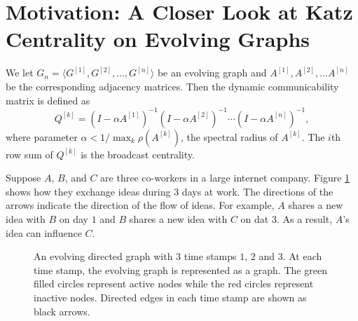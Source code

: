 \documentclass[12pt]{article}
\theoremstyle{definition}
\begin{document}
\section{Motivation: A Closer Look at Katz Centrality on Evolving Graphs}
\label{sec:motivation}

We let $G_n = \langle G^{[1]}, G^{[2]}, \ldots, G^{[n]} \rangle$ be an evolving graph
and $A^{[1]}, A^{[2]}, \dots A^{[n]}$ be the corresponding adjacency matrices.
Then the dynamic communicability matrix is defined as
\begin{equation}
  \label{eq:q}
  Q^{[k]} = (I - \alpha A^{[1]})^{-1}(I - \alpha A^{[2]})^{-1} \cdots (I -  \alpha A^{[n]})^{-1},
\end{equation}
where parameter $\alpha < 1/ \max_k \rho(A^{[k]})$, the spectral radius of $A^{[k]}$.
The $i$th row sum of $Q^{[k]}$ is the broadcast centrality.


Suppose $A$, $B$, and $C$ are three co-workers in a large internet company. Figure \ref{fig:katz_eg}
shows how they exchange ideas during $3$ days at work. The directions of the arrows indicate the direction of the flow of ideas.
For example, $A$ shares a new idea with $B$ on day $1$ and $B$ shares a new idea with $C$ on dat $3$. As a result, $A$'s idea can influence $C$.

\begin{figure}[h]
 \begin{center}
\end{center}
\caption{An evolving directed graph with 3 time stamps $1$, $2$ and $3$.
At each time stamp, the evolving graph is represented as a graph.
The green filled circles represent active nodes while the red circles represent
inactive nodes. Directed edges in each time stamp are shown as black arrows.}
\label{fig:katz_eg}
\end{figure}
\end{document}
